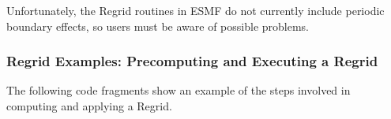 Unfortunately, the Regrid routines in ESMF do not currently include periodic
boundary effects, so users must be aware of possible problems.


\subsubsection{Regrid Examples: Precomputing and Executing a Regrid}
\label{sec:RegridExamples}

The following code fragments show an example of the steps involved in
computing and applying a Regrid.



